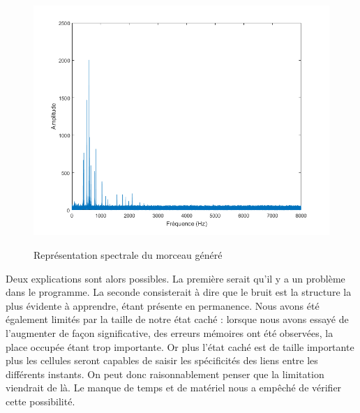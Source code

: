 \begin{figure}[!h]
\begin{center}
	{\includegraphics[scale=0.4]{images/chapter9/spectre.png}\label{spectre}}
  \caption{Représentation spectrale du morceau généré}
\end{center}
\end{figure}

Deux explications sont alors possibles. La première serait qu'il y a un problème dans le programme. La seconde consisterait à dire que le bruit est la structure la plus évidente à apprendre, étant présente en permanence. Nous avons été également limités par la taille de notre état caché : lorsque nous avons essayé de l'augmenter de façon significative, des erreurs mémoires ont été observées, la place occupée étant trop importante. Or plus l'état caché est de taille importante plus les cellules seront capables de saisir les spécificités des liens entre les différents instants. On peut donc raisonnablement penser que la limitation viendrait de là. Le manque de temps et de matériel nous a empêché de vérifier cette possibilité.


